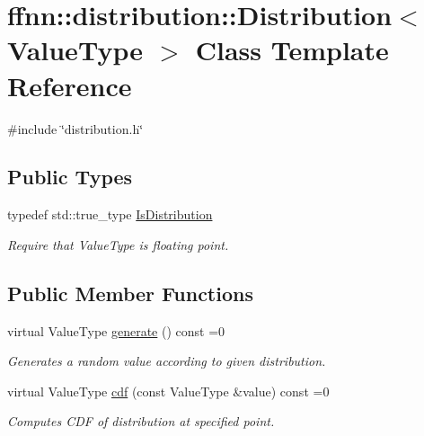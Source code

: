 \hypertarget{classffnn_1_1distribution_1_1_distribution}{\section{ffnn\-:\-:distribution\-:\-:Distribution$<$ Value\-Type $>$ Class Template Reference}
\label{classffnn_1_1distribution_1_1_distribution}
}


{\ttfamily \#include \char`\"{}distribution.\-h\char`\"{}}

\subsection*{Public Types}
\begin{DoxyCompactItemize}
\item 
typedef std\-::true\-\_\-type \hyperlink{classffnn_1_1distribution_1_1_distribution_aa553d99dbb2eb2ed0633a916c6ba04ea}{Is\-Distribution}
\begin{DoxyCompactList}\small\item\em Require that Value\-Type is floating point. \end{DoxyCompactList}\end{DoxyCompactItemize}
\subsection*{Public Member Functions}
\begin{DoxyCompactItemize}
\item 
virtual Value\-Type \hyperlink{classffnn_1_1distribution_1_1_distribution_adfbfb073a8df2f255961aa44743aaddb}{generate} () const =0
\begin{DoxyCompactList}\small\item\em Generates a random value according to given distribution. \end{DoxyCompactList}\item 
virtual Value\-Type \hyperlink{classffnn_1_1distribution_1_1_distribution_abd2db033dd692d4b78915734c5c02204}{cdf} (const Value\-Type \&value) const =0
\begin{DoxyCompactList}\small\item\em Computes C\-D\-F of distribution at specified point. \end{DoxyCompactList}\end{DoxyCompactItemize}


